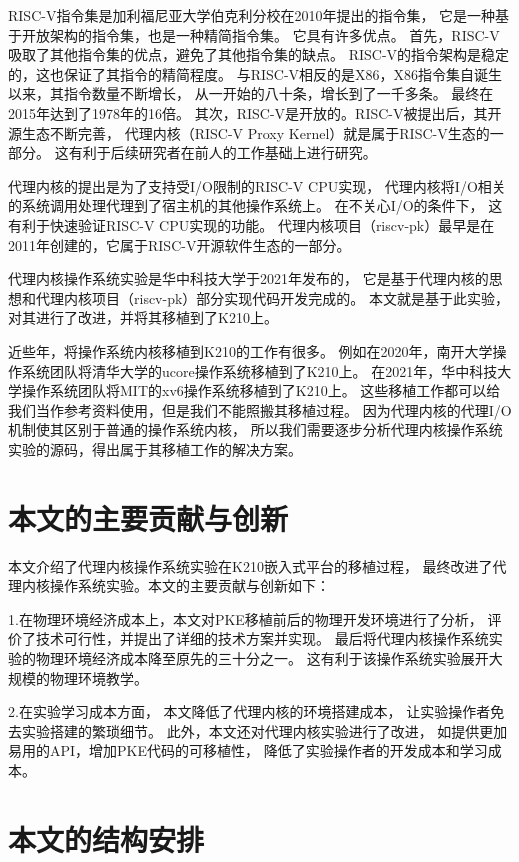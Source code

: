 RISC-V指令集是加利福尼亚大学伯克利分校在2010年提出的指令集，
它是一种基于开放架构的指令集，也是一种精简指令集。\cite{雷思磊2017RISC}
它具有许多优点。
首先，RISC-V吸取了其他指令集的优点，避免了其他指令集的缺点。
RISC-V的指令架构是稳定的，这也保证了其指令的精简程度。
与RISC-V相反的是X86，X86指令集自诞生以来，其指令数量不断增长，
从一开始的八十条，增长到了一千多条。
最终在2015年达到了1978年的16倍。
其次，RISC-V是开放的。RISC-V被提出后，其开源生态不断完善，
代理内核（RISC-V Proxy Kernel）就是属于RISC-V生态的一部分。
这有利于后续研究者在前人的工作基础上进行研究。\cite{胡振波2019RISC}

代理内核的提出是为了支持受I/O限制的RISC-V CPU实现，
代理内核将I/O相关的系统调用处理代理到了宿主机的其他操作系统上。
在不关心I/O的条件下，
这有利于快速验证RISC-V CPU实现的功能。
代理内核项目（riscv-pk）最早是在2011年创建的，它属于RISC-V开源软件生态的一部分。

代理内核操作系统实验是华中科技大学于2021年发布的，
它是基于代理内核的思想和代理内核项目（riscv-pk）部分实现代码开发完成的。
本文就是基于此实验，对其进行了改进，并将其移植到了K210上。

近些年，将操作系统内核移植到K210的工作有很多。\cite{孙卫真2021基于}
例如在2020年，南开大学操作系统团队将清华大学的ucore操作系统移植到了K210上。
在2021年，华中科技大学操作系统团队将MIT的xv6操作系统移植到了K210上。
这些移植工作都可以给我们当作参考资料使用，但是我们不能照搬其移植过程。
因为代理内核的代理I/O机制使其区别于普通的操作系统内核，
所以我们需要逐步分析代理内核操作系统实验的源码，得出属于其移植工作的解决方案。



\section{本文的主要贡献与创新}

本文介绍了代理内核操作系统实验在K210嵌入式平台的移植过程，
最终改进了代理内核操作系统实验。本文的主要贡献与创新如下：

1.在物理环境经济成本上，本文对PKE移植前后的物理开发环境进行了分析，
评价了技术可行性，并提出了详细的技术方案并实现。
最后将代理内核操作系统实验的物理环境经济成本降至原先的三十分之一。
这有利于该操作系统实验展开大规模的物理环境教学。

2.在实验学习成本方面，
本文降低了代理内核的环境搭建成本，
让实验操作者免去实验搭建的繁琐细节。
此外，本文还对代理内核实验进行了改进，
如提供更加易用的API，增加PKE代码的可移植性，
降低了实验操作者的开发成本和学习成本。

\section{本文的结构安排}

